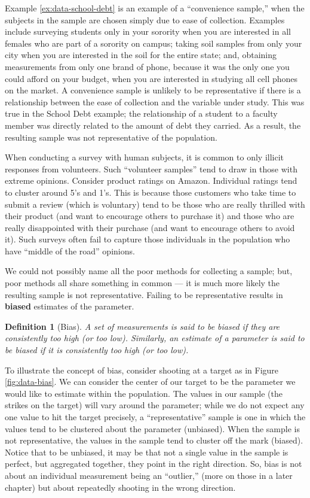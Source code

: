 \documentclass[
]{book}
\theoremstyle{plain}
\theoremstyle{mydefn}
\newtheorem{definition}{Definition}[chapter]
\theoremstyle{myexmpl}
\theoremstyle{remark}
\begin{document}
Example \ref{ex:data-school-debt} is an example of a ``convenience sample,'' when the subjects in the sample are chosen simply due to ease of collection. Examples include surveying students only in your sorority when you are interested in all females who are part of a sorority on campus; taking soil samples from only your city when you are interested in the soil for the entire state; and, obtaining measurements from only one brand of phone, because it was the only one you could afford on your budget, when you are interested in studying all cell phones on the market. A convenience sample is unlikely to be representative if there is a relationship between the ease of collection and the variable under study. This was true in the School Debt example; the relationship of a student to a faculty member was directly related to the amount of debt they carried. As a result, the resulting sample was not representative of the population.

When conducting a survey with human subjects, it is common to only illicit responses from volunteers. Such ``volunteer samples'' tend to draw in those with extreme opinions. Consider product ratings on Amazon. Individual ratings tend to cluster around 5's and 1's. This is because those customers who take time to submit a review (which is voluntary) tend to be those who are really thrilled with their product (and want to encourage others to purchase it) and those who are really disappointed with their purchase (and want to encourage others to avoid it). Such surveys often fail to capture those individuals in the population who have ``middle of the road'' opinions.

We could not possibly name all the poor methods for collecting a sample; but, poor methods all share something in common --- it is much more likely the resulting sample is not representative. Failing to be representative results in \textbf{biased} estimates of the parameter.

\begin{definition}[Bias]
\protect\hypertarget{def:defn-bias}{}{\label{def:defn-bias} {} }A set of measurements is said to be biased if they are \emph{consistently} too high (or too low). Similarly, an estimate of a parameter is said to be biased if it is \emph{consistently} too high (or too low).
\end{definition}

To illustrate the concept of bias, consider shooting at a target as in Figure \ref{fig:data-bias}. We can consider the center of our target to be the parameter we would like to estimate within the population. The values in our sample (the strikes on the target) will vary around the parameter; while we do not expect any one value to hit the target precisely, a ``representative'' sample is one in which the values tend to be clustered about the parameter (unbiased). When the sample is not representative, the values in the sample tend to cluster off the mark (biased). Notice that to be unbiased, it may be that not a single value in the sample is perfect, but aggregated together, they point in the right direction. So, bias is not about an individual measurement being an ``outlier,'' (more on those in a later chapter) but about repeatedly shooting in the wrong direction.
\end{document}
